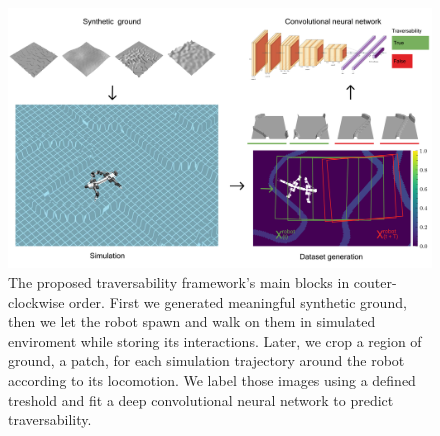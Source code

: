 \documentclass[../document.tex]{subfiles}
\begin{document}
\begin{figure}[H]
    \centering
        \includegraphics[width=\textwidth]{../img/method.png}
    \caption{The proposed traversability framework's main blocks in couter-clockwise order. First we generated meaningful synthetic ground, then we let the robot spawn and walk on them in simulated enviroment while storing its interactions. Later, we crop a region of ground, a patch, for each simulation trajectory around the robot according to its locomotion. We label those images using a defined treshold and fit a deep convolutional neural network to predict traversability. }
    \end{figure}
\end{document}
